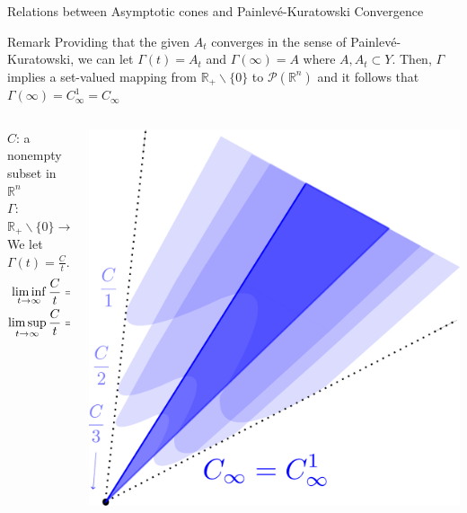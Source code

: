 \documentclass[aspectratio=169, dvipdfmx, 11pt]{beamer} %
\newcommand{\RealNumberSet}{\mathbb{R}}
\newcommand{\NDemenstionalRealEuclidianSpace}{\mathbb{R}^n}
\newcommand{\Painleve}{Painlev\'e}
\begin{document}
\begin{frame}[t]{Relations between Asymptotic cones and \Painleve-Kuratowski Convergence}
  \begin{alertblock}{Remark}
    Providing that the given $A_t$ converges in the sense of \Painleve-Kuratowski, we can let $\Gamma (t) = A_t$ and $\Gamma (\infty) = A$ where $A, A_t \subset Y$.
    Then, $\Gamma$ implies a set-valued mapping from $\RealNumberSet_{+}\backslash\{0\}$ to $\mathcal{P}(\NDemenstionalRealEuclidianSpace)$ and it follows that $\Gamma (\infty) = C^1_{\infty} = C_{\infty}$
  \end{alertblock}

  \begin{columns}
    \begin{column}{0.48\textwidth}
    $C$: a nonempty subset in $\NDemenstionalRealEuclidianSpace$ \\
    $\Gamma$: $\RealNumberSet_{+}\backslash\{0\}  \rightarrow \mathcal{P}(\NDemenstionalRealEuclidianSpace)$ \\
    We let $\Gamma (t) = \frac{C}{t}$. \\
    \pause
    \centering
    \begin{equation}
        \begin{split}
            \liminf_{t \to \infty} \frac{C}{t} &= C^1_{\infty} \\
            \limsup_{t \to \infty}\frac{C}{t} &= C_{\infty} \notag
        \end{split}
    \end{equation}
    \end{column}
    \pause
    \begin{column}{0.48\textwidth}
    \centering
    \includegraphics[keepaspectratio, scale=0.09]{figures/relation_asymptotice_cone_and_p_k_convergence.eps}
    \end{column}
  \end{columns}
\end{frame}
\end{document}

